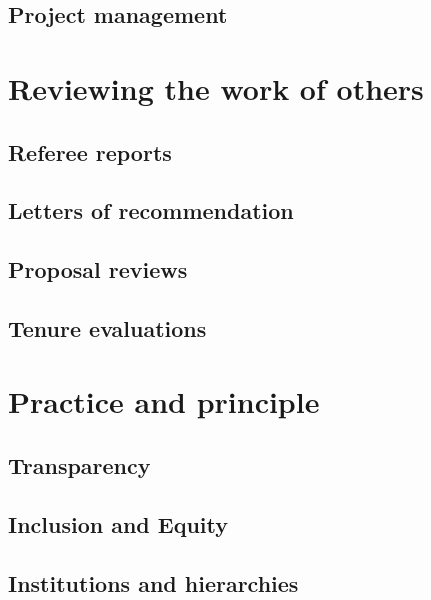 \documentclass[letterpaper]{book}
\begin{document}
\chapter{Project management}

\part{Reviewing the work of others}

\chapter{Referee reports}

\chapter{Letters of recommendation}

\chapter{Proposal reviews}

\chapter{Tenure evaluations}

\part{Practice and principle}

\chapter{Transparency}

\chapter{Inclusion and Equity}

\chapter{Institutions and hierarchies}
\end{document}
